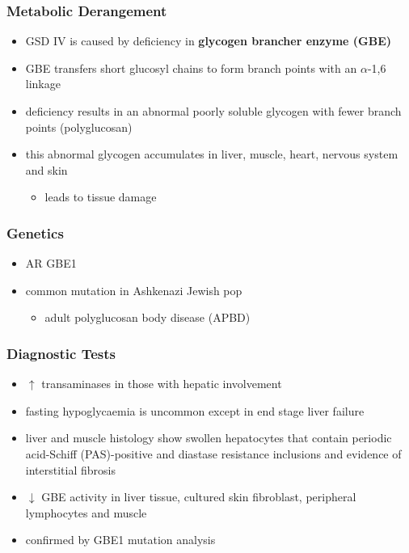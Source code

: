 \documentclass[12pt]{scrartcl}
\begin{document}
\subsubsection{Metabolic Derangement}
\label{sec:org8b09061}
\begin{itemize}
\item GSD IV is caused by deficiency in \textbf{glycogen brancher enzyme (GBE)}
\item GBE transfers short glucosyl chains to form branch points with an
\(\alpha\)-1,6 linkage
\item deficiency results in an abnormal poorly soluble glycogen with fewer branch points (polyglucosan)
\item this abnormal glycogen accumulates in liver, muscle, heart, nervous system and skin
\begin{itemize}
\item leads to tissue damage
\end{itemize}
\end{itemize}

\subsubsection{Genetics}
\label{sec:orgc44a885}
\begin{itemize}
\item AR GBE1
\item common mutation in Ashkenazi Jewish pop
\begin{itemize}
\item adult polyglucosan body disease (APBD)
\end{itemize}
\end{itemize}

\subsubsection{Diagnostic Tests}
\label{sec:org57b78f9}

\begin{itemize}
\item \(\uparrow\) transaminases in those with hepatic involvement
\item fasting hypoglycaemia is uncommon except in end stage liver failure
\item liver and muscle histology show swollen hepatocytes that contain
periodic acid-Schiff (PAS)-positive and diastase resistance
inclusions and evidence of interstitial fibrosis
\item \(\downarrow\) GBE activity in liver tissue, cultured skin fibroblast,
peripheral lymphocytes and muscle
\item confirmed by GBE1 mutation analysis
\end{itemize}
\end{document}
